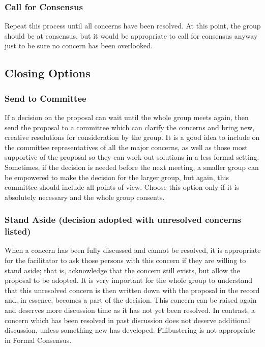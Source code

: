 \subsubsection*{Call for Consensus}

Repeat this process until all concerns have been resolved. At this point, the group should be at consensus, but it would be appropriate to call for consensus anyway just to be sure no concern has been overlooked.

\subsection*{Closing Options}
\subsubsection*{Send to Committee}
If a decision on the proposal can wait until the whole group meets again, then send the proposal to a committee which can clarify the concerns and bring new, creative resolutions for consideration by the group. It is a good idea to include on the committee representatives of all the major concerns, as well as those most supportive of the proposal so they can work out solutions in a less formal setting. Sometimes, if the decision is needed before the next meeting, a smaller group can be empowered to make the decision for the larger group, but again, this committee should include all points of view. Choose this option only if it is absolutely necessary and the whole group consents.

\subsubsection*{Stand Aside (decision adopted with unresolved concerns listed)}

When a concern has been fully discussed and cannot be resolved, it is appropriate for the facilitator to ask those persons with this concern if they are willing to stand aside; that is, acknowledge that the concern still exists, but allow the proposal to be adopted. It is very important for the whole group to understand that this unresolved concern is then written down with the proposal in the record and, in essence, becomes a part of the decision. This concern can be raised again and deserves more discussion time as it has not yet been resolved. In contrast, a concern which has been resolved in past discussion does not deserve additional discussion, unless something new has developed. Filibustering is not appropriate in Formal Consensus.

